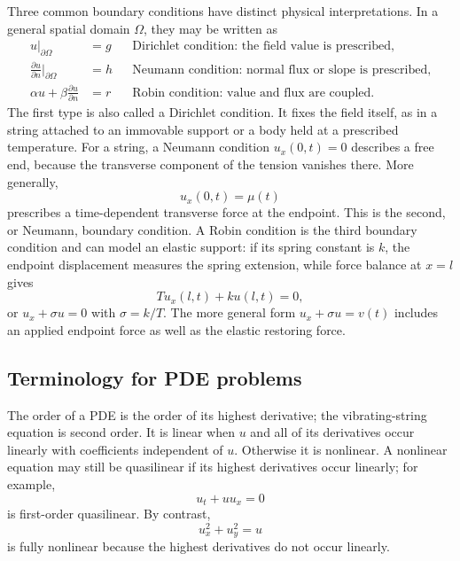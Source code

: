 Three common boundary conditions have distinct physical interpretations. In a general spatial domain $\Omega$, they may be written as
\begin{align}
u|_{\partial\Omega}&=g &&\text{Dirichlet condition: the field value is prescribed},\\
\frac{\partial u}{\partial n}\bigg|_{\partial\Omega}&=h &&\text{Neumann condition: normal flux or slope is prescribed},\\
\alpha u+\beta\frac{\partial u}{\partial n}&=r &&\text{Robin condition: value and flux are coupled}.
\end{align}
The first type is also called a Dirichlet condition. It fixes the field itself, as in a string attached to an immovable support or a body held at a prescribed temperature. For a string, a Neumann condition $u_x(0,t)=0$ describes a free end, because the transverse component of the tension vanishes there. More generally,
\begin{equation}
u_x(0,t)=\mu(t)
\end{equation}
prescribes a time-dependent transverse force at the endpoint. This is the second, or Neumann, boundary condition. A Robin condition is the third boundary condition and can model an elastic support: if its spring constant is $k$, the endpoint displacement measures the spring extension, while force balance at $x=l$ gives
\begin{equation}
T u_x(l,t)+k u(l,t)=0,
\end{equation}
or $u_x+\sigma u=0$ with $\sigma=k/T$. The more general form $u_x+\sigma u=v(t)$ includes an applied endpoint force as well as the elastic restoring force.

\subsection{Terminology for PDE problems}

The order of a PDE is the order of its highest derivative; the vibrating-string equation is second order. It is linear when $u$ and all of its derivatives occur linearly with coefficients independent of $u$. Otherwise it is nonlinear. A nonlinear equation may still be quasilinear if its highest derivatives occur linearly; for example,
\begin{equation}
u_t+u u_x=0
\end{equation}
is first-order quasilinear. By contrast,
\begin{equation}
u_x^2+u_y^2=u
\end{equation}
is fully nonlinear because the highest derivatives do not occur linearly.

